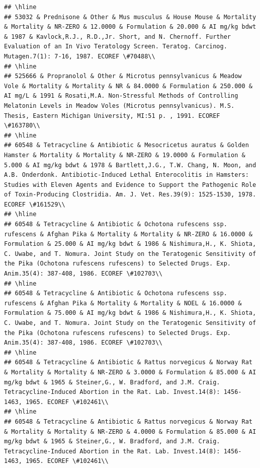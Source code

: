 \documentclass[12pt,]{article}
\begin{document}
\begin{verbatim}
## \hline
## 53032 & Prednisone & Other & Mus musculus & House Mouse & Mortality & Mortality & NR-ZERO & 12.0000 & Formulation & 20.000 & AI mg/kg bdwt & 1987 & Kavlock,R.J., R.D.,Jr. Short, and N. Chernoff. Further Evaluation of an In Vivo Teratology Screen. Teratog. Carcinog. Mutagen.7(1): 7-16, 1987. ECOREF \#70488\\
## \hline
## 525666 & Propranolol & Other & Microtus pennsylvanicus & Meadow Vole & Mortality & Mortality & NR & 84.0000 & Formulation & 250.000 & AI mg/L & 1991 & Rosati,M.A. Non-Stressful Methods of Controlling Melatonin Levels in Meadow Voles (Microtus pennsylvanicus). M.S. Thesis, Eastern Michigan University, MI:51 p. , 1991. ECOREF \#163780\\
## \hline
## 60548 & Tetracycline & Antibiotic & Mesocricetus auratus & Golden Hamster & Mortality & Mortality & NR-ZERO & 19.0000 & Formulation & 5.000 & AI mg/kg bdwt & 1978 & Bartlett,J.G., T.W. Chang, N. Moon, and A.B. Onderdonk. Antibiotic-Induced Lethal Enterocolitis in Hamsters: Studies with Eleven Agents and Evidence to Support the Pathogenic Role of Toxin-Producing Clostridia. Am. J. Vet. Res.39(9): 1525-1530, 1978. ECOREF \#161529\\
## \hline
## 60548 & Tetracycline & Antibiotic & Ochotona rufescens ssp. rufescens & Afghan Pika & Mortality & Mortality & NR-ZERO & 16.0000 & Formulation & 25.000 & AI mg/kg bdwt & 1986 & Nishimura,H., K. Shiota, C. Uwabe, and T. Nomura. Joint Study on the Teratogenic Sensitivity of the Pika (Ochotona rufescens rufescens) to Selected Drugs. Exp. Anim.35(4): 387-408, 1986. ECOREF \#102703\\
## \hline
## 60548 & Tetracycline & Antibiotic & Ochotona rufescens ssp. rufescens & Afghan Pika & Mortality & Mortality & NOEL & 16.0000 & Formulation & 75.000 & AI mg/kg bdwt & 1986 & Nishimura,H., K. Shiota, C. Uwabe, and T. Nomura. Joint Study on the Teratogenic Sensitivity of the Pika (Ochotona rufescens rufescens) to Selected Drugs. Exp. Anim.35(4): 387-408, 1986. ECOREF \#102703\\
## \hline
## 60548 & Tetracycline & Antibiotic & Rattus norvegicus & Norway Rat & Mortality & Mortality & NR-ZERO & 3.0000 & Formulation & 85.000 & AI mg/kg bdwt & 1965 & Steiner,G., W. Bradford, and J.M. Craig. Tetracycline-Induced Abortion in the Rat. Lab. Invest.14(8): 1456-1463, 1965. ECOREF \#102461\\
## \hline
## 60548 & Tetracycline & Antibiotic & Rattus norvegicus & Norway Rat & Mortality & Mortality & NR-ZERO & 4.0000 & Formulation & 85.000 & AI mg/kg bdwt & 1965 & Steiner,G., W. Bradford, and J.M. Craig. Tetracycline-Induced Abortion in the Rat. Lab. Invest.14(8): 1456-1463, 1965. ECOREF \#102461\\

\end{verbatim}
\end{document}
